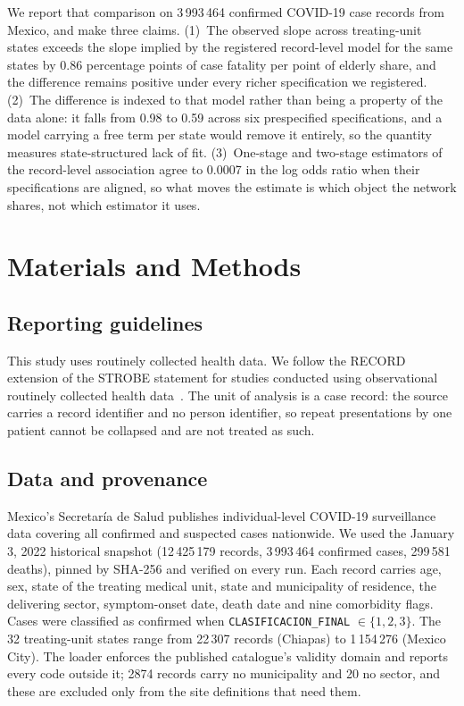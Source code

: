\documentclass[11pt]{article}
\begin{document}
We report that comparison on 3\,993\,464 confirmed COVID-19 case records
from Mexico, and make three claims.  (1)~The observed slope across
treating-unit states exceeds the slope implied by the registered
record-level model for the same states by 0.86 percentage points of case
fatality per point of elderly share, and the difference remains positive
under every richer specification we registered.  (2)~The difference is
indexed to that model rather than being a property of the data alone: it
falls from 0.98 to 0.59 across six prespecified specifications, and a
model carrying a free term per state would remove it entirely, so the
quantity measures state-structured lack of fit.  (3)~One-stage and
two-stage estimators of the record-level association agree to 0.0007 in
the log odds ratio when their specifications are aligned, so what moves
the estimate is which object the network shares, not which estimator it
uses.

\section{Materials and Methods}

\subsection{Reporting guidelines}

This study uses routinely collected health data.  We follow the RECORD
extension of the STROBE statement for studies conducted using
observational routinely collected health data~\cite{benchimol2015record}.
The unit of analysis is a case record: the source carries a record
identifier and no person identifier, so repeat presentations by one
patient cannot be collapsed and are not treated as such.

\subsection{Data and provenance}

Mexico's Secretar\'{i}a de Salud publishes individual-level COVID-19
surveillance data covering all confirmed and suspected cases
nationwide.  We used the January 3, 2022 historical snapshot
(12\,425\,179 records, 3\,993\,464 confirmed cases, 299\,581 deaths),
pinned by SHA-256 and verified on every run.  Each record carries age,
sex, state of the treating medical unit, state and municipality of
residence, the delivering sector, symptom-onset date, death date and
nine comorbidity flags.  Cases were classified as confirmed when
\texttt{CLASIFICACION\_FINAL} $\in \{1,2,3\}$.  The 32 treating-unit
states range from 22\,307 records (Chiapas) to 1\,154\,276 (Mexico
City).  The loader enforces the published catalogue's validity domain
and reports every code outside it; 2874 records carry no municipality
and 20 no sector, and these are excluded only from the site definitions
that need them.
\end{document}
